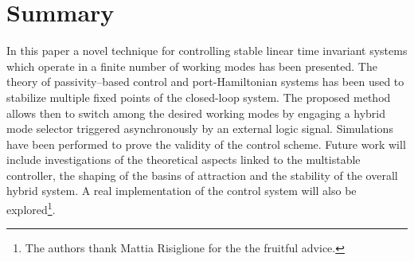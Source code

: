 %
%
%	
\section{Summary}
In this paper a novel technique for controlling stable linear time invariant systems which operate in a finite number of working modes has been presented. 
The theory of passivity--based control and port-Hamiltonian systems has been used to stabilize multiple fixed points of the closed-loop system. The proposed method allows then to switch among the desired working modes by engaging a hybrid mode selector triggered asynchronously by an external logic signal. Simulations have been performed to prove the validity of the control scheme.
Future work will include investigations of the theoretical aspects linked to the multistable controller, the shaping of the basins of attraction and the stability of the overall hybrid system. A real implementation of the control system will also be explored\footnote{The authors thank Mattia Risiglione for the the fruitful advice.}.
